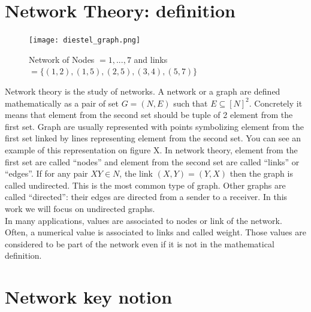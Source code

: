 \documentclass[a4paper, 12pt]{report}
\begin{document}
\section{Network Theory: definition}
\begin{figure}
\centering
\texttt{[image: diestel\_graph.png]}
\caption{Network of Nodes $= 1,...,7$ and links $= \{(1, 2), (1, 5), (2, 5), (3, 4), (5, 7)\}$  \citep{diestel}}
\label{diestel graph}
\end{figure}

Network theory is the study of networks. A  network or a graph are defined mathematically as a pair of set $G = (N, E)$ such that $E  \subseteq [N ]^2$. Concretely it means that element from the second set should be tuple of 2 element from the first set.
Graph are usually represented with points symbolizing element from the first set linked by lines representing element from the second set. You can see an example of this representation on figure X. In network theory, element from the first set are called ``nodes'' and element from the second set are called ``links'' or ``edges''. If for any pair $XY \in N$,  the link $(X,Y) = (Y,X)$ then the graph is called undirected. This is the most common type of graph. Other graphs are called ``directed'': their edges are directed from a sender to a receiver. In this work we will focus on undirected graphs. \citep{diestel}\\

In many applications, values are associated to nodes or link of the network. Often, a numerical value is associated to links and called weight. Those values are considered to be part of the network even if it is not in the mathematical definition. 


\section{Network key notion}
\end{document}
